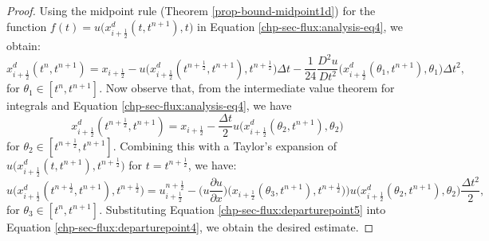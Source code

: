 \begin{proof}
	Using the midpoint rule (Theorem \ref{prop-bound-midpoint1d}) for the function 
   $f(t) = u\big(x_{i+\frac{1}{2}}^d(t,t^{n+1}),t\big)$ in Equation \eqref{chp-sec-flux:analysis-eq4}, we obtain:
	\begin{equation}
		\label{chp-sec-flux:departurepoint4}
	   x_{i+\frac{1}{2}}^d(t^n,t^{n+1}) = x_{i+\frac{1}{2}} 
      - u\big(x_{i+\frac{1}{2}}^d (t^{n+\frac{1}{2}},t^{n+1}),t^{n+\frac{1}{2}}\big)\Delta t 
      - \frac{1}{24}\frac{D^2u}{Dt^2}\big(x_{i+\frac{1}{2}}^d(\theta_1,t^{n+1}),\theta_1\big)\Delta t^2,
	\end{equation}
	for $\theta_1 \in [t^n, t^{n+1}]$.
   Now observe that, from the intermediate value theorem for integrals and Equation \eqref{chp-sec-flux:analysis-eq4}, we have
\begin{equation*}
x_{i+\frac{1}{2}}^d(t^{n+\frac{1}{2}},t^{n+1})  =
x_{i+\frac{1}{2}} - \frac{\Delta t}{2}u\big(x_{i+\frac{1}{2}}^d(\theta_2,t^{n+1}), \theta_2 \big)
\end{equation*}
	for $\theta_2 \in [t^{n+\frac{1}{2}}, t^{n+1}]$.
   Combining this with a Taylor's expansion of $u\big(x_{i+\frac{1}{2}}^d(t,t^{n+1}),t^{n+\frac{1}{2}}\big)$ for $t = t^{n+\frac{1}{2}}$, we have:
	\begin{equation}
		\label{chp-sec-flux:departurepoint5}
		u\big(x_{i+\frac{1}{2}}^d(t^{n+\frac{1}{2}},t^{n+1}),t^{n+\frac{1}{2}}\big) = u^{n+\frac{1}{2}}_{i+\frac{1}{2}} - 
        \bigg(u\frac{\partial u}{\partial x}\bigg)\big(x_{i+\frac{1}{2}}(\theta_3,t^{n+1}),t^{n+\frac{1}{2}})\big)
        u\big(x_{i+\frac{1}{2}}^d(\theta_2,t^{n+1}), \theta_2 \big)\frac{\Delta t^2}{2},
	\end{equation}
	for $\theta_3 \in [t^n, t^{n+1}]$.
	Substituting Equation \eqref{chp-sec-flux:departurepoint5} into Equation \eqref{chp-sec-flux:departurepoint4}, we obtain the desired estimate.
\end{proof}

